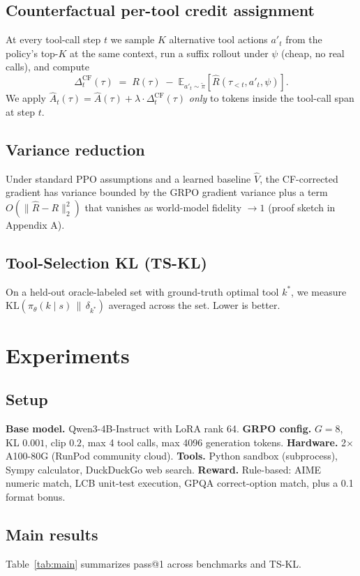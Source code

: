 \documentclass{article}
\begin{document}
\subsection{Counterfactual per-tool credit assignment}\label{sec:cf}
At every tool-call step $t$ we sample $K$ alternative tool actions $a'_t$ from the policy's top-$K$ at the same context, run a suffix rollout under $\psi$ (cheap, no real calls), and compute
\[
  \Delta_t^{\text{CF}}(\tau) \;=\; R(\tau) \;-\; \mathbb{E}_{a'_t \sim \tilde{\pi}}\!\left[\hat{R}(\tau_{<t}, a'_t, \psi)\right].
\]
We apply $\hat{A}_t(\tau) = \hat{A}(\tau) + \lambda \cdot \Delta_t^{\text{CF}}(\tau)$ \emph{only} to tokens inside the tool-call span at step $t$.

\subsection{Variance reduction}\label{sec:variance}
Under standard PPO assumptions and a learned baseline $\hat{V}$, the CF-corrected gradient has variance bounded by the GRPO gradient variance plus a term $O(\|\hat{R} - R\|_2^2)$ that vanishes as world-model fidelity $\to 1$ (proof sketch in Appendix A).

\subsection{Tool-Selection KL (TS-KL)}\label{sec:tskl}
On a held-out oracle-labeled set with ground-truth optimal tool $k^*$, we measure $\mathrm{KL}(\pi_\theta(k\mid s) \,\|\, \delta_{k^*})$ averaged across the set. Lower is better.

\section{Experiments}\label{sec:exp}

\subsection{Setup}
\textbf{Base model.} Qwen3-4B-Instruct with LoRA rank 64. \textbf{GRPO config.} $G=8$, KL $0.001$, clip $0.2$, max 4 tool calls, max 4096 generation tokens. \textbf{Hardware.} 2$\times$ A100-80G (RunPod community cloud). \textbf{Tools.} Python sandbox (subprocess), Sympy calculator, DuckDuckGo web search. \textbf{Reward.} Rule-based: AIME numeric match, LCB unit-test execution, GPQA correct-option match, plus a 0.1 format bonus.

\subsection{Main results}
Table~\ref{tab:main} summarizes pass@1 across benchmarks and TS-KL.
\begin{table}[h]\centering\small\caption{Main results. \textbf{Bold}=best.}\label{tab:main}

\end{table}
\end{document}
